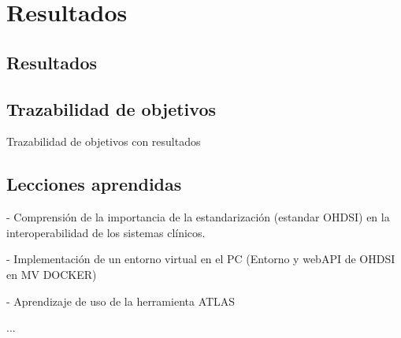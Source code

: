 \chapter{Resultados}\label{cap:09resultados}

\section{Resultados}


\section{Trazabilidad de objetivos}

Trazabilidad de objetivos con resultados

\section{Lecciones aprendidas}

- Comprensión de la importancia de la estandarización (estandar OHDSI) en la interoperabilidad de los sistemas clínicos.

- Implementación de un entorno virtual en el PC (Entorno y webAPI de OHDSI en MV DOCKER)

- Aprendizaje de uso de la herramienta ATLAS

...